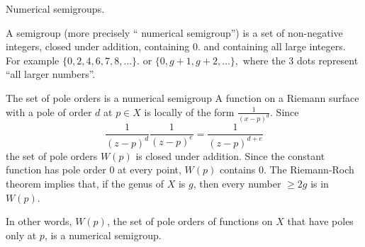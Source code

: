 \documentclass[12pt, aspectratio=169]{beamer}
\begin{document}
\begin{frame}{Numerical semigroups.}
 
 A \alert{semigroup} (more precisely `` numerical semigroup'') is a set of  non-negative integers, 
  \alert{closed under addition}, \alert{containing 0}. and containing all large integers.  For
 example 
 $
\{0,2, 4, 6, 7, 8,\dots\}.
 $
or 
$
 \{0,g+1,g+2,\dots\},
 $
where the 3 dots represent ``all larger numbers''.
\bigskip
\end{frame}


\begin{frame}{The set of pole orders is a numerical semigroup}
A function on a Riemann surface with a pole of order $d$ at $p\in X$ is locally of the form
$
\frac{1}{(x-p)^d} .
$
Since 
$$
\frac{1}{(z-p)^d}\frac{1}{(z-p)^e} = \frac{1}{(z-p)^{d+e}}
$$
 the set of pole orders $W(p)$ is \alert{closed under addition}.  Since the constant function has pole order 0 at every point, $W(p)$ \alert{contains 0}. The Riemann-Roch theorem implies that, if the genus of $X$ is $g$, then
  \alert{every number $\geq 2g$ is in $W(p)$}.
  
 \medskip
 In other words, $W(p)$, the set of pole orders of functions on $X$ that have poles only at $p$, is a \alert{numerical semigroup}.
 
\end{frame}
\end{document}
